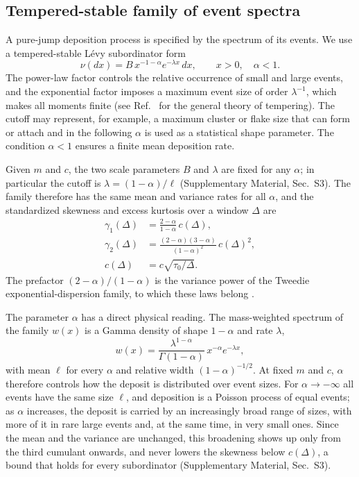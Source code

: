 \documentclass[preprint,12pt]{elsarticle}
\begin{document}
\subsection{Tempered-stable family of event spectra}
\label{sec:tempered}

A pure-jump deposition process is specified by the spectrum of its events. 
We use a tempered-stable L\'evy subordinator form
\begin{equation}
  \nu(dx)=B\,x^{-1-\alpha}e^{-\lambda x}\,dx,\qquad x>0,\quad\alpha<1 .
    \label{eq:tempered_stable}
\end{equation}
The power-law factor controls the relative occurrence of small and large
events, and the exponential factor imposes a maximum event size of order
$\lambda^{-1}$, which makes all moments finite (see Ref.~\cite{Rosinski2007}
for the general theory of tempering). The cutoff may represent, for example, a
maximum cluster or flake size that can form or attach 
and in the following $\alpha$ is used as a statistical shape
parameter. The condition $\alpha<1$ ensures a finite mean deposition rate.

Given $m$ and $c$, the two scale parameters $B$ and $\lambda$ are fixed for
any $\alpha$; in particular the cutoff is $\lambda=(1-\alpha)/\ell$
(Supplementary Material, Sec.~S3). The family therefore has the same mean and
variance rates for all $\alpha$, and the standardized skewness and excess
kurtosis over a window $\Delta$ are
\begin{equation}
\begin{aligned}
  \gamma_1(\Delta)&=\frac{2-\alpha}{1-\alpha}\,c(\Delta), \\
  \gamma_2(\Delta)&=\frac{(2-\alpha)(3-\alpha)}{(1-\alpha)^2}\,c(\Delta)^2, \\
  c(\Delta)&=c\sqrt{\tau_0/\Delta}.
\end{aligned}
\label{eq:aggregation_scaling}
\end{equation}
The prefactor $(2-\alpha)/(1-\alpha)$ is the variance power of the
Tweedie exponential-dispersion family, to which these laws belong
\cite{Jorgensen1987,Hougaard1986}.

The parameter $\alpha$ has a direct physical reading. The mass-weighted
spectrum of the family $w(x)$
is a Gamma density of shape $1-\alpha$ and rate
$\lambda$,
\begin{equation}
  w(x)=\frac{\lambda^{1-\alpha}}{\Gamma(1-\alpha)}\,x^{-\alpha}e^{-\lambda x},
  \label{eq:mass_spectrum}
\end{equation}
with mean $\ell$ for every $\alpha$ and relative width $(1-\alpha)^{-1/2}$. At
fixed $m$ and $c$, $\alpha$ therefore controls how the deposit is distributed
over event sizes. For $\alpha\to-\infty$ all events have the same size
$\ell$, and deposition is a Poisson process of equal events; as $\alpha$
increases, the deposit is carried by an increasingly broad range of sizes,
with more of it in rare large events and, at the same time, in very small
ones. Since the mean and the variance are unchanged, this broadening shows up
only from the third cumulant onwards, and never lowers the
skewness below $c(\Delta)$, a bound that holds for every subordinator
(Supplementary Material, Sec.~S3).
\end{document}
